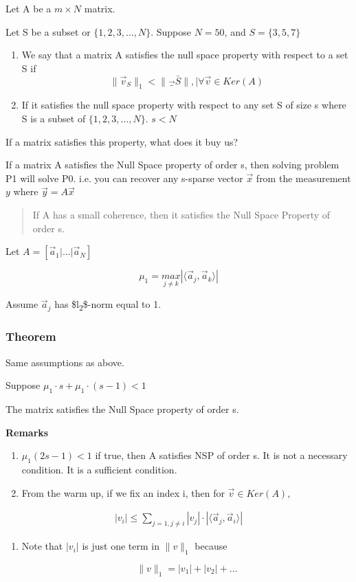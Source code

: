 \documentclass[11pt]{article}
\begin{document}
Let A be a \(m \times N\) matrix.

Let S be a subset or \(\{1,2,3,...,N\}\). Suppose \(N = 50\), and \(S = \{3,5,7\}\)

\begin{enumerate}
\item We say that a matrix A satisfies the null space property with respect to a
set S if
$$
   \| \vec v_S \|_1 < \| \vec_{\bar S} \|, | \forall \vec v \in Ker(A)
   $$
\item If it satisfies the null space property with respect to any set S of size s
where S is a subset of \(\{1,2,3,...,N\}\). \(s < N\)
\end{enumerate}

If a matrix satisfies this property, what does it buy us?

If a matrix A satisfies the Null Space property of order s, then solving problem
P1 will solve P0. i.e. you can recover any s-sparse vector \(\vec x\) from the
measurement \(y\) where \(\vec y = A \vec x\)

\begin{quote}
If A has a small coherence, then it satisfies the Null Space Property of order s.
\end{quote}

Let \(A = [\vec a_1| ... | \vec a_N]\)

$$
\mu_1 = \underset{j \neq k}{max} |\langle \vec a_j, \vec a_k \rangle|
$$

Assume \(\vec a_j\) has \$l\textsubscript{2}\$-norm equal to 1.

\subsubsection{Theorem}
\label{sec:org563a637}

Same assumptions as above.

Suppose \(\mu_1 \cdot s + \mu_1 \cdot (s - 1) < 1\)

The matrix satisfies the Null Space property of order s.

\textbf{Remarks}
\begin{enumerate}
\item \(\mu_1 (2s - 1) < 1\) if true, then A satisfies NSP of order s. It is not a
necessary condition. It is a sufficient condition.
\item From the warm up, if we fix an index i, then for \(\vec v \in Ker(A)\),
\end{enumerate}
\begin{equation}
\begin{split}
|v_i| \leq \sum_{j = 1, j \neq i}^{} |v_j| \cdot |\langle \vec a_j, \vec a_i \rangle|
\end{split}
\end{equation}
\begin{enumerate}
\item Note that \(|v_i|\) is just one term in \(\|v\|_1\) because

$$
   \|v\|_1 = |v_1| + |v_2| + ...
   $$
\end{enumerate}
\end{document}

